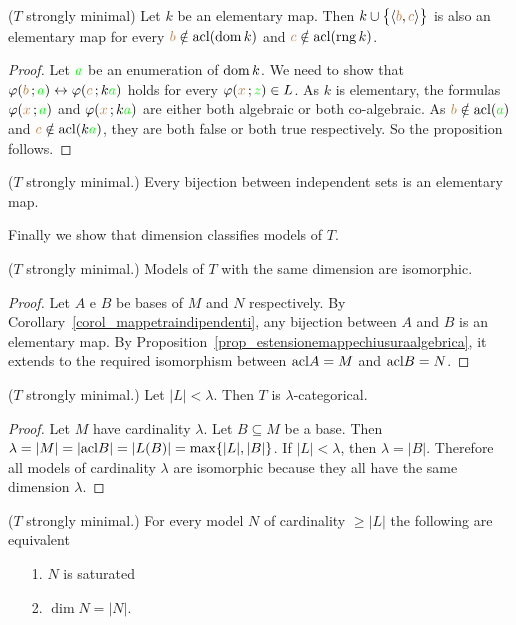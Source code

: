 \begin{proposition}\label{prop_mappetraindipendenti}
  ($T$ strongly minimal) 
  Let $k$ be an elementary map.
  Then $k\cup\big\{\langle{\color{brown}b},{\color{brown} c}\rangle\big\}$ is also an elementary map for every ${\color{brown} b}\notin{\rm acl}(\mathop{\rm dom} k)$ and ${\color{brown} c}\notin{\rm acl}(\mathop{\rm rng} k)$.
\end{proposition}
\begin{proof}
  Let ${\color{green} a}$ be an enumeration of $\mathop{\rm dom} k$.
  We need to show that $\varphi({\color{brown} b}\,;{\color{green} a})\leftrightarrow\varphi({\color{brown} c}\,;k{\color{green} a})$ holds for every $\varphi({\color{brown} x}\,;{\color{green} z})\in L$.
  As $k$ is elementary, the formulas $\varphi({\color{brown} x}\,;{\color{green} a})$ and $\varphi({\color{brown} x}\,;k{\color{green} a})$ are either both algebraic or both co-algebraic.
  As ${\color{brown} b}\notin{\rm acl}({\color{green} a})$ and ${\color{brown} c}\notin{\rm acl}(k{\color{green} a})$, they are both false or both true respectively.
  So the proposition follows.
\end{proof}

\begin{corollary}\label{corol_mappetraindipendenti} 
  ($T$ strongly minimal.) Every bijection between independent sets is an elementary map.
\end{corollary}

Finally we show that dimension classifies models of $T$.

\begin{theorem}
  ($T$ strongly minimal.) Models of $T$ with the same dimension are isomorphic.
\end{theorem}
\begin{proof}
  Let $A$ e $B$ be bases of $M$ and $N$ respectively.
  By Corollary~\ref{corol_mappetraindipendenti}, any bijection between $A$ and $B$ is an elementary map.
  By Proposition~\ref{prop_estensionemappechiusuraalgebrica}, it extends to the required isomorphism between ${\rm acl} A=M$ and ${\rm acl} B=N$.
\end{proof}

\begin{corollary} 
  ($T$ strongly minimal.) Let $|L|<\lambda$. Then $T$ is $\lambda$-categorical.
\end{corollary}
\begin{proof}
  Let $M$ have cardinality $\lambda$. 
  Let $B\subseteq M$  be a base.
  Then $\lambda=|M|=|{\rm acl} B|=|L(B)|=\max\{|L|,|B|\}$.
  If $|L|<\lambda$, then $\lambda=|B|$.
  Therefore all models of cardinality $\lambda$ are isomorphic because they all have the same dimension $\lambda$.
\end{proof}

\begin{proposition}
  ($T$ strongly minimal.) For every model $N$ of cardinality $\ge|L|$ the following are equivalent
  \begin{itemize}
  \item[1.] $N$ is saturated
  \item[2.] $\dim N=|N|$.
  \end{itemize}
\end{proposition}

